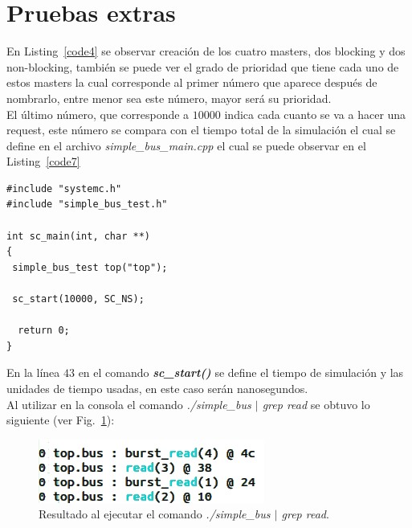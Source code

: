 \documentclass[twocolumn]{IEEEtran}
\begin{document}
%
%
%
%
%
%
\section{Pruebas extras}
\noindent
En Listing~\ref{code4} se observar creación de los cuatro masters, dos blocking y dos non-blocking, también se puede ver el grado de prioridad que tiene cada uno de estos masters la cual corresponde al primer número que aparece después de nombrarlo, entre menor sea este número, mayor será su prioridad.\\
El último número, que corresponde a $10000$ indica cada cuanto se va a hacer una request, este número se compara con el tiempo total de la simulación el cual se define en el archivo \textit{simple\_bus\_main.cpp} el cual se puede observar en el Listing~\ref{code7}
\lstset{numbers=left, numberstyle=\footnotesize , stepnumber=1, numbersep=1pt}
\begin{lstlisting}[firstnumber=36, caption=Contenido del archivo simple\_bus\_main.cpp., label=code7]
#include "systemc.h"
#include "simple_bus_test.h"

int sc_main(int, char **)
{
 simple_bus_test top("top");

 sc_start(10000, SC_NS);
 
  return 0;
}
\end{lstlisting}
\noindent
En la línea $43$ en el comando \textbf{\textit{sc\_start()}} se define el tiempo de simulación y las unidades de tiempo usadas, en este caso serán nanosegundos.\\
Al utilizar en la consola el comando \textit{./simple\_bus $\mid$ grep read} se obtuvo lo siguiente (ver Fig.~\ref{fig4}):
\begin{figure}[H]
  \centering
    \includegraphics[scale=0.5]{fig4.png}
  \caption{Resultado al ejecutar el comando \textit{./simple\_bus $\mid$ grep read}.}
 \label{fig4}
\end{figure}
\end{document}
